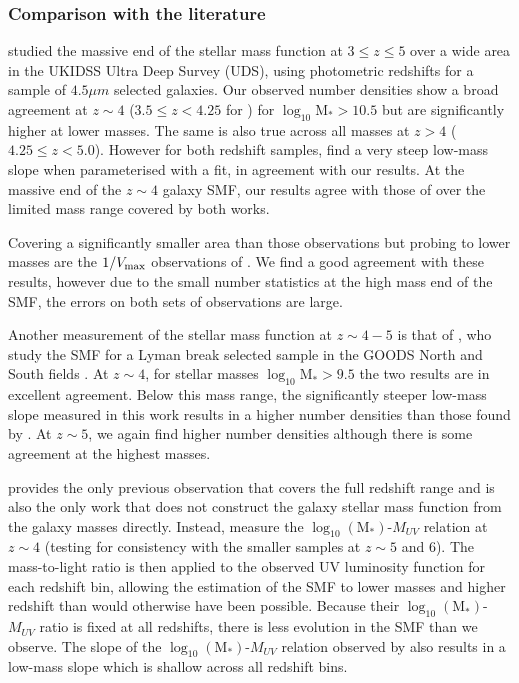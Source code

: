 \subsubsection{Comparison with the literature}
\citet{2011MNRAS.413..162C} studied the massive end of the stellar mass function at $3 \leq z \leq 5$ over a wide area in the UKIDSS Ultra Deep Survey (UDS), using photometric redshifts for a sample of $4.5\mu m$ selected galaxies. Our observed number densities show a broad agreement at $z \sim 4$ ($3.5 \leq z < 4.25$ for \citeauthor{2011MNRAS.413..162C}) for $\log_{10}\text{M}_{*} > 10.5$ but are significantly higher at lower masses. The same is also true across all masses at $z > 4$ ($4.25 \leq z < 5.0$). However for both redshift samples, \citet{2011MNRAS.413..162C} find a very steep low-mass slope when parameterised with a \citet{Schechter:1976gl} fit, in agreement with our results. At the massive end of the $z\sim4$ galaxy SMF, our results agree with those of \citet{Muzzin:2013bl} over the limited mass range covered by both works.

Covering a significantly smaller area than those observations but probing to lower masses are the $1/V_{\rm{max}}$ observations of \citet{Santini:2012jq}. We find a good agreement with these results, however due to the small number statistics at the high mass end of the SMF, the errors on both sets of observations are large.

Another measurement of the stellar mass function at $z \sim 4 - 5$ is that of \citet{2012ApJ...752...66L}, who study the SMF for a Lyman break selected sample in the GOODS North and South fields \citep{2004ApJ...600L..93G}. At $z \sim 4$, for stellar masses $\log_{10}\text{M}_{*} > 9.5$ the two results are in excellent agreement. Below this mass range, the significantly steeper low-mass slope measured in this work results in a higher number densities than those found by \citet{2012ApJ...752...66L}. At $z \sim 5$, we again find higher number densities although there is some agreement at the highest masses. 

\citet{Gonzalez:2011dn} provides the only previous observation that covers the full redshift range and is also the only work that does not construct the galaxy stellar mass function from the galaxy masses directly. Instead, \citet{Gonzalez:2011dn} measure the $\log_{10} (\text{M}_{*})$-$M_{UV}$ relation at $z \sim 4$ (testing for consistency with the smaller samples at $z \sim 5$ and 6). The mass-to-light ratio is then applied to the observed UV luminosity function for each redshift bin, allowing the estimation of the SMF to lower masses and higher redshift than would otherwise have been possible. Because their $\log_{10} (\text{M}_{*})$-$M_{UV}$ ratio is fixed at all redshifts, there is less evolution in the SMF than we observe. The slope of the $\log_{10} (\text{M}_{*})$-$M_{UV}$ relation observed by \citet{Gonzalez:2011dn} also results in a low-mass slope which is shallow across all redshift bins.

